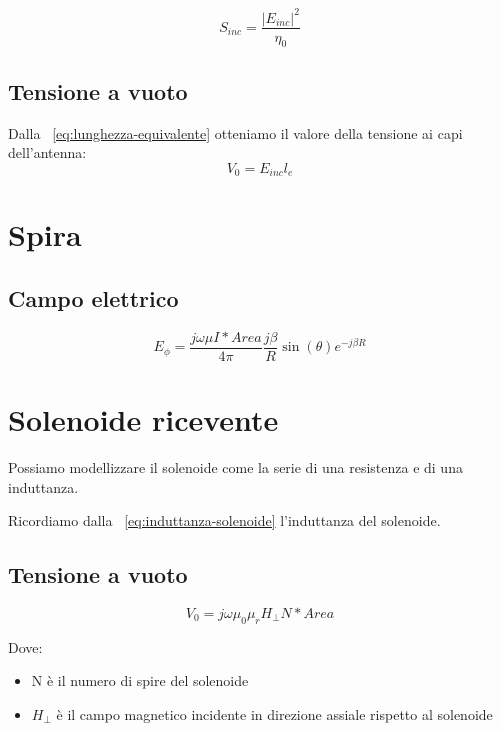 \documentclass[10pt,a4paper]{report}
\begin{document}
			\begin{equation}
			S_{inc}=\frac{|E_{inc}|^2}{\eta_0}	
			\end{equation}

			\subsection{Tensione a vuoto}			
				Dalla ~\ref{eq:lunghezza-equivalente} otteniamo il valore della tensione ai capi dell'antenna:
				\begin{equation}
				V_0=E_{inc}l_e
				\end{equation}

		\section{Spira}

			\subsection{Campo elettrico}

				\begin{equation}
				E_\phi=\frac{j\omega\mu I*Area}{4\pi}\frac{j\beta}{R}\sin(\theta)e^{-j\beta R}
				\end{equation}

		\section{Solenoide ricevente}
			
			Possiamo modellizzare il solenoide come la serie di una resistenza e di una induttanza.

			Ricordiamo dalla ~\ref{eq:induttanza-solenoide} l'induttanza del solenoide.

		 	\subsection{Tensione a vuoto}

				 \begin{equation}
				 V_0=j\omega\mu_0\mu_rH_{\perp}N*Area
				 \end{equation}

				 Dove:
				 \begin{itemize}
				 \item N è il numero di spire del solenoide 
				 \item $H_{\perp}$ è il campo magnetico incidente in direzione assiale rispetto al solenoide
				 \end{itemize}
\end{document}
